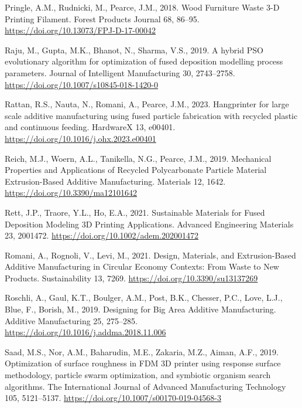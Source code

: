 \documentclass[
  12pt,
  number,
  review]{elsarticle}
\newlength{\cslhangindent}
\newlength{\cslentryspacingunit} %
\newenvironment{CSLReferences}[2] %
 {%
  \setlength{\parindent}{0pt}
  \ifodd #1
  \let\oldpar\par
  \def\par{\hangindent=\cslhangindent\oldpar}
  \fi
  \setlength{\parskip}{#2\cslentryspacingunit}
 }%
 {}
\begin{document}
\begin{CSLReferences}{1}{0}
\leavevmode{}%
Pringle, A.M., Rudnicki, M., Pearce, J.M., 2018. Wood {Furniture
Waste} 3-{D Printing Filament}. Forest
Products Journal 68, 86--95.
\url{https://doi.org/10.13073/FPJ-D-17-00042}

\leavevmode{}%
Raju, M., Gupta, M.K., Bhanot, N., Sharma, V.S., 2019. A hybrid
{PSO} evolutionary algorithm for optimization of fused
deposition modelling process parameters. Journal of Intelligent
Manufacturing 30, 2743--2758.
\url{https://doi.org/10.1007/s10845-018-1420-0}

\leavevmode{}%
Rattan, R.S., Nauta, N., Romani, A., Pearce, J.M., 2023. Hangprinter for
large scale additive manufacturing using fused particle fabrication with
recycled plastic and continuous feeding. HardwareX 13, e00401.
\url{https://doi.org/10.1016/j.ohx.2023.e00401}

\leavevmode{}%
Reich, M.J., Woern, A.L., Tanikella, N.G., Pearce, J.M., 2019.
Mechanical {Properties} and {Applications} of {Recycled Polycarbonate
Particle Material Extrusion-Based Additive Manufacturing}. Materials 12,
1642. \url{https://doi.org/10.3390/ma12101642}

\leavevmode{}%
Rett, J.P., Traore, Y.L., Ho, E.A., 2021. Sustainable {Materials} for
{Fused Deposition Modeling 3D Printing Applications}. Advanced
Engineering Materials 23, 2001472.
\url{https://doi.org/10.1002/adem.202001472}

\leavevmode{}%
Romani, A., Rognoli, V., Levi, M., 2021. Design, {Materials}, and
{Extrusion-Based Additive Manufacturing} in {Circular Economy Contexts}:
{From Waste} to {New Products}. Sustainability 13, 7269.
\url{https://doi.org/10.3390/su13137269}

\leavevmode{}%
Roschli, A., Gaul, K.T., Boulger, A.M., Post, B.K., Chesser, P.C., Love,
L.J., Blue, F., Borish, M., 2019. Designing for {Big Area Additive
Manufacturing}. Additive Manufacturing 25, 275--285.
\url{https://doi.org/10.1016/j.addma.2018.11.006}

\leavevmode{}%
Saad, M.S., Nor, A.M., Baharudin, M.E., Zakaria, M.Z., Aiman, A.F.,
2019. Optimization of surface roughness in {FDM 3D} printer using
response surface methodology, particle swarm optimization, and symbiotic
organism search algorithms. The International Journal of Advanced
Manufacturing Technology 105, 5121--5137.
\url{https://doi.org/10.1007/s00170-019-04568-3}


\end{CSLReferences}
\end{document}
